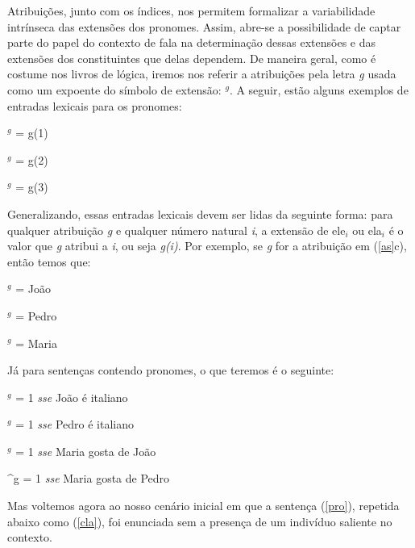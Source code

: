 Atribuições, junto com os índices, nos permitem
formalizar a variabilidade intrínseca das extensões dos pronomes. Assim, abre-se a possibilidade de captar parte do papel do contexto de fala na determinação dessas extensões e das extensões dos constituintes que delas dependem. De maneira geral, como é costume nos livros de lógica,
iremos nos referir a atribuições pela letra \textit{g} usada
como um expoente do símbolo de extensão: \den{$\alpha$}$^{g}$.
A seguir, estão alguns exemplos de entradas lexicais para os
pronomes:

\begin{exe}
\ex {}$^{g}$ = g(1)\label{g1}

\ex {}$^{g}$ = g(2)

\ex {}$^{g}$ = g(3)

\end{exe}

\n Generalizando, essas entradas lexicais devem ser lidas da
seguinte forma: para qualquer atribuição \textit{g} e qualquer
número natural \textit{i}, a extensão de ele$_{i}$ ou ela$_{i}$ é o
valor que \textit{g} atribui a \textit{i}, ou seja \textit{g(i)}. Por exemplo, se \textit{g} for a atribuição em (\ref{as}c), então temos que:

\begin{exe}

\ex {}$^{g}$ = João

\ex {}$^{g}$ = Pedro

\ex {}$^{g}$ = Maria

\end{exe}

Já para sentenças contendo pronomes, o que teremos é o seguinte:

\begin{exe}

\ex {}$^{g}$ = 1 \textit{sse} João é italiano

\ex {}$^{g}$ = 1 \textit{sse} Pedro é italiano

\ex {}$^{g}$ = 1 \textit{sse} Maria gosta de
João

\ex {}^{g} = 1 \textit{sse} Maria gosta de
Pedro

\end{exe}

Mas voltemos agora ao nosso cenário inicial em que a sentença
(\ref{pro}), repetida abaixo como (\ref{cla}), foi enunciada sem a
presença de um indivíduo saliente no contexto.

